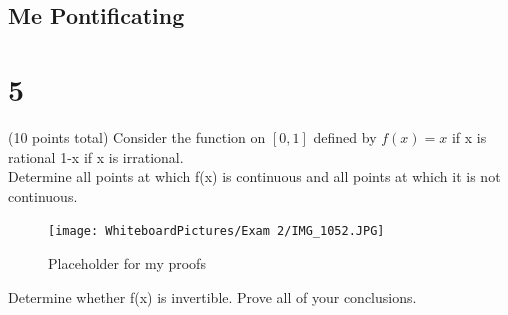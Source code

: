 \subsection*{Me Pontificating}
\begin{figure}[h]\end{figure} 

\newpage
\section*{5}
(10 points total) Consider the function on $[0,1]$ defined by $f(x)= {x}$ if x is rational 1-x if x is irrational. \\ 
Determine all points at which f(x) is continuous and all points at which it is not continuous.

\begin{figure}[h]\begin{center}\texttt{[image: WhiteboardPictures/Exam 2/IMG\_1052.JPG]}
\caption{Placeholder for my proofs} \label{fig:Euler_pic}\end{center}\end{figure} 
\newpage

Determine whether f(x) is invertible. Prove all of your conclusions. 

\begin{figure}[h]\end{figure} 


